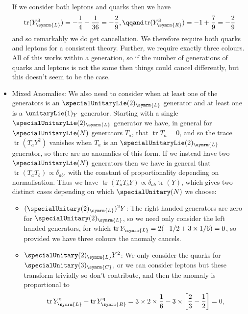 \documentclass[fleqn]{NotesClass}
\newcommand{\Pparticle}[1]{\mathrm{#1}}
\newcommand{\Pq}{\ensuremath{\Pparticle{q}}}
\DeclareMathOperator{\tr}{tr}
\newcommand{\Left}{\symrm{L}}
\newcommand{\Right}{\symrm{R}}
\begin{document}
\begin{itemize}
        If we consider both leptons and quarks then we have
        \begin{equation}
            \tr(Y_{\Left}^3) = -\frac{1}{4} + \frac{1}{36} = -\frac{2}{9}, \qqand \tr(Y_{\Right}^3) = -1 + \frac{7}{9} = -\frac{2}{9}
        \end{equation}
        and so remarkably we do get cancellation.
        We therefore require both quarks and leptons for a consistent theory.
        Further, we require exactly three colours.
        All of this works within a generation, so if the number of generations of quarks and leptons is not the same then things could cancel differently, but this doesn't seem to be the case.
        
        \item Mixed Anomalies:
        We also need to consider when at least one of the generators is an \(\specialUnitaryLie(2)_{\Left}\) generator and at least one is a \(\unitaryLie(1)_{Y}\) generator.
        Starting with a single \(\specialUnitaryLie(2)_{\Left}\) generator we have, in general for \(\specialUnitaryLie(N)\) generators \(T_a\), that \(\tr T_a = 0\), and so the trace \(\tr(T_aY^2)\) vanishes when \(T_a\) is an \(\specialUnitaryLie(2)_{\Left}\) generator, so there are no anomalies of this form.
        If we instead have two \(\specialUnitaryLie(N)\) generators then we have in general that \(\tr(T_a T_b) \propto \delta_{ab}\), with the constant of proportionality depending on normalisation.
        Thus we have \(\tr(T_aT_bY) \propto \delta_{ab}\tr(Y)\), which gives two distinct cases depending on which \(\specialUnitary(N)\) we choose:
        \begin{itemize}
            \item \((\specialUnitary(2)_{\Left})^2Y\): The right handed generators are zero for \(\specialUnitary(2)_{\Left}\), so we need only consider the left handed generators, for which \(\tr Y_{\Left} = 2(-1/2 + 3 \times 1/6) = 0\), so provided we have three colours the anomaly cancels.
            \item \(\specialUnitary(2)_{\Left}Y^2\): We only consider the quarks for \(\specialUnitary(3)_{\symrm{C}}\), or we can consider leptons but these transform trivially so don't contribute, and then the anomaly is proportional to
            \begin{equation}
                \tr Y_{\Left}^{\Pq} - \tr Y_{\Right}^{\Pq} = 3 \times 2 \times \frac{1}{6} - 3 \times \left[ \frac{2}{3} - \frac{1}{2} \right] = 0,
            \end{equation}

\end{itemize}
\end{itemize}
\end{document}
